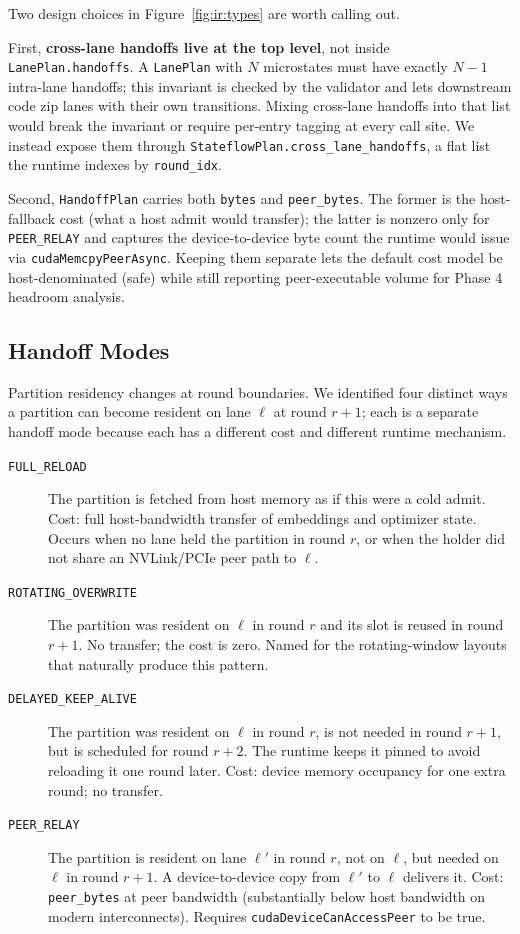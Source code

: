 Two design choices in Figure~\ref{fig:ir:types} are worth calling out.

First, \textbf{cross-lane handoffs live at the top level}, not inside
\texttt{LanePlan.handoffs}. A \texttt{LanePlan} with $N$ microstates
must have exactly $N-1$ intra-lane handoffs; this invariant is checked
by the validator and lets downstream code zip lanes with their own
transitions. Mixing cross-lane handoffs into that list would break the
invariant or require per-entry tagging at every call site. We instead
expose them through \texttt{StateflowPlan.cross\_lane\_handoffs}, a
flat list the runtime indexes by \texttt{round\_idx}.

Second, \texttt{HandoffPlan} carries both \texttt{bytes} and
\texttt{peer\_bytes}. The former is the host-fallback cost (what a
host admit would transfer); the latter is nonzero only for
\texttt{PEER\_RELAY} and captures the device-to-device byte count the
runtime would issue via \texttt{cudaMemcpyPeerAsync}. Keeping them
separate lets the default cost model be host-denominated (safe) while
still reporting peer-executable volume for Phase 4 headroom analysis.

\subsection{Handoff Modes}\label{sec:ir:modes}

Partition residency changes at round boundaries. We identified four
distinct ways a partition can become resident on lane $\ell$ at round
$r{+}1$; each is a separate handoff mode because each has a different
cost and different runtime mechanism.

\begin{description}
\item[\texttt{FULL\_RELOAD}] The partition is fetched from host memory
as if this were a cold admit. Cost: full host-bandwidth transfer of
embeddings and optimizer state. Occurs when no lane held the partition
in round $r$, or when the holder did not share an NVLink/PCIe peer
path to $\ell$.
\item[\texttt{ROTATING\_OVERWRITE}] The partition was resident on $\ell$
in round $r$ and its slot is reused in round $r{+}1$. No transfer; the
cost is zero. Named for the rotating-window layouts that naturally
produce this pattern.
\item[\texttt{DELAYED\_KEEP\_ALIVE}] The partition was resident on $\ell$
in round $r$, is not needed in round $r{+}1$, but is scheduled for
round $r{+}2$. The runtime keeps it pinned to avoid reloading it one
round later. Cost: device memory occupancy for one extra round; no
transfer.
\item[\texttt{PEER\_RELAY}] The partition is resident on lane $\ell'$
in round $r$, not on $\ell$, but needed on $\ell$ in round $r{+}1$. A
device-to-device copy from $\ell'$ to $\ell$ delivers it. Cost:
\texttt{peer\_bytes} at peer bandwidth (substantially below host
bandwidth on modern interconnects). Requires
\texttt{cudaDeviceCanAccessPeer} to be true.
\end{description}

